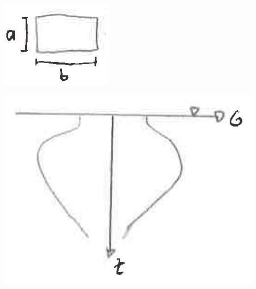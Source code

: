 \begin{multicols}{2}
\begin{minipage}[t]{0.5\linewidth}
		\vspace{\baselineskip}
	\end{minipage}
	\begin{minipage}[t]{0.3\linewidth}
		\vspace{2\baselineskip}
		\qquad \includegraphics[width=0.7\linewidth]{images/SpimBoden1.PNG}
	\end{minipage}
	\begin{minipage}[t]{0.5\linewidth}
		\vspace{2\baselineskip}
		\includegraphics[width=0.4\linewidth]{images/SpimBoden2Verlauf.PNG}
	\end{minipage}
	
	
\end{multicols}

